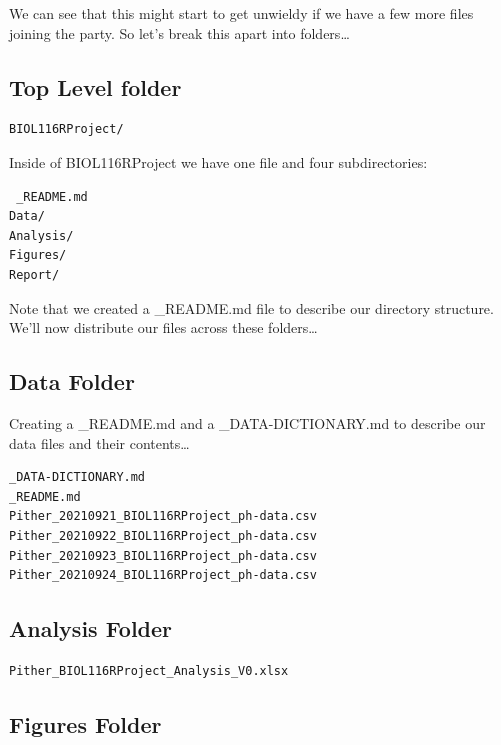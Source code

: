 \documentclass[
]{book}
\begin{document}
We can see that this might start to get unwieldy if we have a few more files joining the party. So let's break this apart into folders\ldots{}

\hypertarget{top-level-folder}{%
\subsection*{Top Level folder}\label{top-level-folder}}

\begin{verbatim}
BIOL116RProject/
\end{verbatim}

Inside of BIOL116RProject we have one file and four subdirectories:

\begin{verbatim}
 _README.md
Data/ 
Analysis/
Figures/
Report/
\end{verbatim}

Note that we created a \_README.md file to describe our directory structure. We'll now distribute our files across these folders\ldots{}

\hypertarget{data-folder}{%
\subsection*{Data Folder}\label{data-folder}}

Creating a \_README.md and a \_DATA-DICTIONARY.md to describe our data files and their contents\ldots{}

\begin{verbatim}
_DATA-DICTIONARY.md
_README.md
Pither_20210921_BIOL116RProject_ph-data.csv
Pither_20210922_BIOL116RProject_ph-data.csv
Pither_20210923_BIOL116RProject_ph-data.csv
Pither_20210924_BIOL116RProject_ph-data.csv
\end{verbatim}

\hypertarget{analysis-folder}{%
\subsection*{Analysis Folder}\label{analysis-folder}}

\begin{verbatim}
Pither_BIOL116RProject_Analysis_V0.xlsx
\end{verbatim}

\hypertarget{figures-folder}{%
\subsection*{Figures Folder}\label{figures-folder}}
\end{document}
